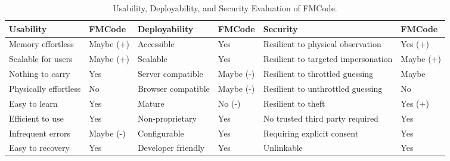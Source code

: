 \documentclass[conference]{IEEEtran}
\begin{document}
\begin{table*}[]
\small
\centering
\caption{Usability, Deployability, and Security Evaluation of FMCode.}
\label{table:uds}
\begin{tabular}{|l|l|l|l|l|l|}
\hline
Usability             & FMCode   & Deployability                      & FMCode & Security                            & FMCode   \\ \hline
Memory effortless     & Maybe (+) & Accessible                         & Yes    & Resilient to physical observation   & Yes (+)   \\ \hline
Scalable for users    & Maybe (+) & Scalable                           & Yes    & Resilient to targeted impersonation & Maybe (+) \\ \hline
Nothing to carry      & Yes      & Server compatible                  & Maybe (-)   & Resilient to throttled guessing     & Maybe    \\ \hline
Physically effortless & No       & Browser compatible                 & Maybe (-)    & Resilient to unthrottled guessing   & No       \\ \hline
Easy to learn         & Yes      & Mature                             & No (-) & Resilient to theft                  & Yes (+)  \\ \hline
Efficient to use      & Yes      & Non-proprietary                    & Yes    & No trusted third party required     & Yes      \\ \hline
Infrequent errors     & Maybe (-)    & Configurable\cite{Engineering}       & Yes    & Requiring explicit consent          & Yes      \\ \hline
Easy to recovery      & Yes      & Developer friendly\cite{Engineering} & Yes    & Unlinkable                          & Yes      \\ \hline
\end{tabular}
\end{table*}
\end{document}
